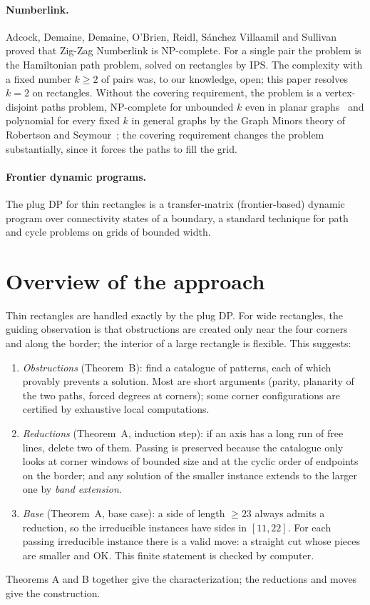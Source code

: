 \documentclass[11pt]{article}
\begin{document}
\paragraph{Numberlink.}
Adcock, Demaine, Demaine, O'Brien, Reidl, S\'anchez Villaamil and Sullivan~\cite{adcock15} proved
that Zig-Zag Numberlink is NP-complete. For a single pair the problem is the Hamiltonian path
problem, solved on rectangles by IPS. The complexity with a fixed number $k \ge 2$ of pairs was,
to our knowledge, open; this paper resolves $k = 2$ on rectangles.
Without the covering requirement, the problem is a vertex-disjoint paths problem, NP-complete for
unbounded $k$ even in planar graphs~\cite{lynch75} and polynomial for every fixed $k$ in general graphs by the
Graph Minors theory of Robertson and Seymour~\cite{rs95}; the covering requirement changes the
problem substantially, since it forces the paths to fill the grid.

\paragraph{Frontier dynamic programs.}
The plug DP for thin rectangles is a transfer-matrix (frontier-based) dynamic program over
connectivity states of a boundary, a standard technique for path and cycle problems on grids of
bounded width.

\section{Overview of the approach}\label{sec:overview}

Thin rectangles are handled exactly by the plug DP. For wide rectangles, the guiding observation
is that obstructions are created only near the four corners and along the border; the interior of
a large rectangle is flexible. This suggests:
\begin{enumerate}
\item \emph{Obstructions} (Theorem~B): find a catalogue of patterns, each of which provably
  prevents a solution. Most are short arguments (parity, planarity of the two paths, forced
  degrees at corners); some corner configurations are certified by exhaustive local computations.
\item \emph{Reductions} (Theorem~A, induction step): if an axis has a long run of free lines,
  delete two of them. Passing is preserved because the catalogue only looks at corner windows of
  bounded size and at the cyclic order of endpoints on the border; and any solution of the smaller
  instance extends to the larger one by \emph{band extension}.
\item \emph{Base} (Theorem~A, base case): a side of length $\ge 23$ always admits a reduction, so
  the irreducible instances have sides in $[11, 22]$. For each passing irreducible instance there
  is a valid move: a straight cut whose pieces are smaller and OK. This finite statement is
  checked by computer.
\end{enumerate}
Theorems A and B together give the characterization; the reductions and moves give the
construction.
\end{document}
